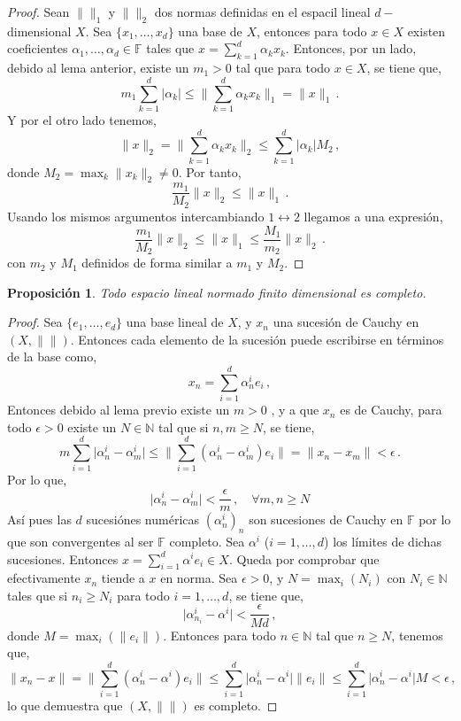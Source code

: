 \documentclass[12pt]{book}
\newtheorem{prop}{\bf Proposición}[chapter]
\def\NN{\mathbb{N}}
\def\FF{\mathbb{F}}
\newcommand{\abs}[1]{\lvert #1\rvert }
\newcommand{\norm}[1]{\lVert #1\rVert }
\begin{document}
\begin{proof}
Sean $\norm{}_1$ y  $\norm{}_2$  dos normas definidas en el espacil lineal $d-$dimensional $X$. 
Sea $\{x_1,\dots,x_d\}$ una base de $X$, entonces para todo $x\in X$ existen coeficientes $
\alpha_1,\dots,\alpha_d\in \FF$ tales que $x=\sum_{k=1}^d \alpha_k x_k$. Entonces, por un lado,  
debido al lema anterior, existe un $m_1>0$ tal que para todo $x\in X$, se tiene que,
$$m_1\sum_{k=1}^d \abs{\alpha_k}\leq \norm{\sum_{k=1}^d\alpha_k x_k}_1=\norm{x}_1\,.$$
Y por el otro lado tenemos,
$$\norm{x}_2=\norm{\sum_{k=1}^d\alpha_k x_k}_2\leq \sum_{k=1}^d\abs{\alpha_k}M_2\,,$$
donde $M_2=\max_k\norm{x_k}_2\not=0$. Por tanto,
$$\frac{m_1}{M_2}\norm{x}_2\leq \norm{x}_1\,.$$
 Usando los mismos argumentos intercambiando $1\leftrightarrow 2$ llegamos a una expresión,
$$\frac{m_1}{M_2}\norm{x}_2\leq \norm{x}_1\leq \frac{M_1}{m_2}\norm{x}_2\,.$$
con $m_2$ y $M_1$ definidos de forma similar a $m_1$ y $M_2$.
\end{proof}
\begin{prop} Todo espacio lineal normado finito dimensional es completo.
\end{prop}
\begin{proof}
Sea $\{e_1,\dots,e_d\}$ una base lineal de $X$, y $x_n$ una sucesión de Cauchy en $(X,\norm{})$. 
Entonces cada elemento de la sucesión  puede escribirse en términos de la base como,
$$x_n =\sum_{i=1}^d \alpha_n^i e_i\,,$$
Entonces debido al lema previo existe un $m>0$ , y a que $x_n$ es de Cauchy, para todo $
\epsilon>0$ existe un $N\in \NN$ tal que si $n,m\geq N$, se tiene,
$$m\sum_{i=1}^d\abs{\alpha_n^i-\alpha_m^i}\leq\norm{\sum_{i=1}^d(\alpha_n^i - \alpha_m^i)e_i}
=\norm{x_n - x_m}<\epsilon\,.$$
Por lo que,
$$\abs{\alpha_n^i - \alpha_m^i}<\frac{\epsilon}{m}\,,\quad\forall m,n\geq N$$
Así pues las $d$ sucesiónes  numéricas $(\alpha_n^i)_n$ son sucesiones de Cauchy en $\FF$ por 
lo que son convergentes al ser $\FF$ completo. Sea $\alpha^i$ ($i=1,\dots,d$)  los límites de 
dichas sucesiones. Entonces $x=\sum_{i=1}^d \alpha^i e_i\in X$. Queda por comprobar que 
efectivamente $x_n$ tiende a $x$ en norma. Sea $\epsilon>0$, y $N=\max_i(N_i)$ con $N_i\in 
\NN$ tales que si $n_i\geq N_i$ para todo $i=1,\dots,d$, se tiene que,
$$\abs{\alpha_{n_i}^i -\alpha^i}<\frac{\epsilon}{Md}\,,$$
donde $M=\max_i(\norm{e_i})$. Entonces para todo $n\in\NN$ tal que $n\geq N$, tenemos que,
$$\norm{x_n-x}=\norm{\sum_{i=1}^d(\alpha_n^i - \alpha^i)e_i}\leq \sum_{i=1}^d\abs{\alpha_n^i - 
\alpha^i}\norm{e_i}\leq \sum_{i=1}^d\abs{\alpha_n^i-\alpha^i}M<\epsilon\,,$$
lo que demuestra que $(X,\norm{})$ es completo.
\end{proof}
\end{document}
